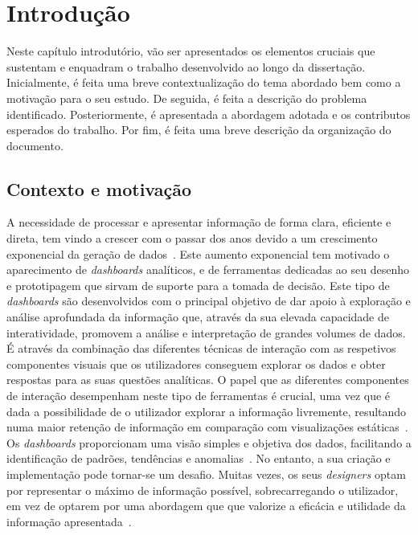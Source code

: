 
%

\chapter{Introdução}
\label{cha:introducao}

Neste capítulo introdutório, vão ser apresentados os elementos cruciais que sustentam e enquadram o trabalho desenvolvido ao longo da dissertação. Inicialmente, é feita uma breve contextualização do tema abordado bem como a motivação para o seu estudo. De seguida, é feita a descrição do problema identificado. Posteriormente, é apresentada a abordagem adotada e os contributos esperados do trabalho. Por fim, é feita uma breve descrição da organização do documento.

\section{Contexto e motivação}
\label{sec:cont_e_motiv}

A necessidade de processar e apresentar informação de forma clara, eficiente e direta, tem vindo a crescer com o passar dos anos devido a um crescimento exponencial da geração de dados~\cite{kitchin2014data}. Este aumento exponencial tem motivado o aparecimento de \textit{dashboards} analíticos, e de ferramentas dedicadas ao seu desenho e prototipagem que sirvam de suporte para a tomada de decisão. Este tipo de \textit{dashboards} são desenvolvidos com o principal objetivo de dar apoio à exploração e análise aprofundada da informação que, através da sua elevada capacidade de interatividade, promovem a análise e interpretação de grandes volumes de dados. É através da combinação das diferentes técnicas de interação com as respetivos componentes visuais que os utilizadores conseguem explorar os dados e obter respostas para as suas questões analíticas. O papel que as diferentes componentes de interação desempenham neste tipo de ferramentas é crucial, uma vez que é dada a possibilidade de o utilizador explorar a informação livremente, resultando numa maior retenção de informação em comparação com visualizações estáticas~\cite{brucker2014learning}. Os \textit{dashboards} proporcionam uma visão simples e objetiva dos dados, facilitando a identificação de padrões, tendências e anomalias~\cite{few2006information}. No entanto, a sua criação e implementação pode tornar-se um desafio. Muitas vezes, os seus \textit{designers} optam por representar o máximo de informação possível, sobrecarregando o utilizador, em vez de optarem por uma abordagem que que valorize a eficácia e utilidade da informação apresentada~\cite{eckerson2010performance}.

